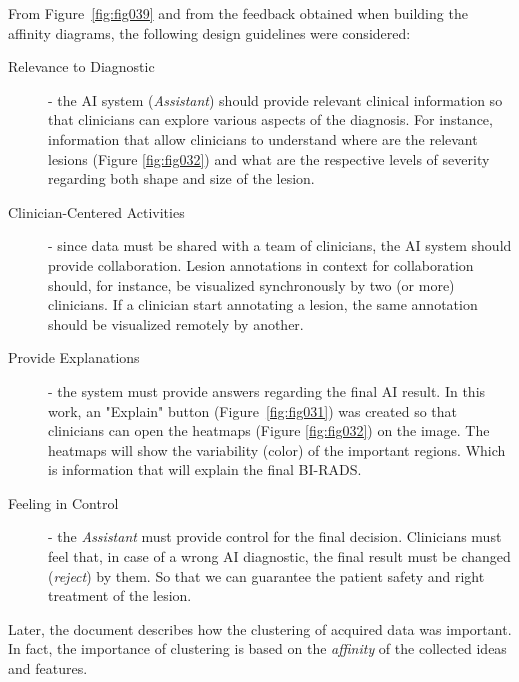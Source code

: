 \noindent
From Figure~\ref{fig:fig039} and from the feedback obtained when building the affinity diagrams, the following design guidelines were considered:

\begin{description}
\item[Relevance to Diagnostic] - the AI system ({\it Assistant}) should provide relevant clinical information so that clinicians can explore various aspects of the diagnosis.
For instance, information that allow clinicians to understand where are the relevant lesions (Figure \ref{fig:fig032}) and what are the respective levels of severity regarding both shape and size of the lesion.

\hfill

\item[Clinician-Centered Activities] - since data must be shared with a team of clinicians, the \ac{AI} system should provide collaboration. Lesion annotations in context for collaboration should, for instance, be visualized synchronously by two (or more) clinicians. If a clinician start annotating a lesion, the same annotation should be visualized remotely by another.

\hfill

\item[Provide Explanations] - the system must provide answers regarding the final \ac{AI} result. In this work, an "Explain" button (Figure~\ref{fig:fig031}) was created so that clinicians can open the heatmaps (Figure \ref{fig:fig032}) on the image. The heatmaps will show the variability (color) of the important regions. Which is information that will explain the final \ac{BI-RADS}.

\hfill

\item[Feeling in Control] - the {\it Assistant} must provide control for the final decision. Clinicians must feel that, in case of a wrong \ac{AI} diagnostic, the final result must be changed ({\it reject}) by them. So that we can guarantee the patient safety and right treatment of the lesion.
\end{description}

\hfill

Later, the document describes how the clustering of acquired data was important.
In fact, the importance of clustering is based on the {\it affinity} of the collected ideas and features.

